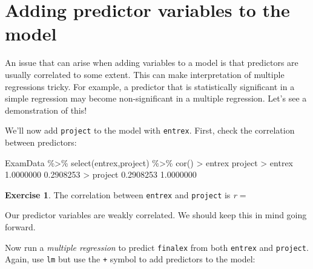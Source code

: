 \documentclass[
]{book}
\newenvironment{Shaded}{\begin{snugshade}}{\end{snugshade}}
\newcommand{\FloatTok}[1]{\textcolor[rgb]{0.00,0.00,0.81}{#1}}
\newcommand{\FunctionTok}[1]{\textcolor[rgb]{0.00,0.00,0.00}{#1}}
\newcommand{\NormalTok}[1]{#1}
\newcommand{\SpecialCharTok}[1]{\textcolor[rgb]{0.00,0.00,0.00}{#1}}
\theoremstyle{definition}
\theoremstyle{definition}
\theoremstyle{definition}
\newtheorem{exercise}{Exercise}[chapter]
\theoremstyle{definition}
\theoremstyle{remark}
\begin{document}
\hypertarget{adding-predictor-variables-to-the-model}{%
\section{Adding predictor variables to the model}\label{adding-predictor-variables-to-the-model}}

An issue that can arise when adding variables to a model is that predictors are usually correlated to some extent. This can make interpretation of multiple regressions tricky. For example, a predictor that is statistically significant in a simple regression may become non-significant in a multiple regression. Let's see a demonstration of this!

We'll now add \texttt{project} to the model with \texttt{entrex}. First, check the correlation between predictors:

\begin{Shaded}
\begin{Highlighting}[]
\NormalTok{ExamData }\SpecialCharTok{\%\textgreater{}\%} 
  \FunctionTok{select}\NormalTok{(entrex,project) }\SpecialCharTok{\%\textgreater{}\%} 
  \FunctionTok{cor}\NormalTok{()}
\SpecialCharTok{\textgreater{}}\NormalTok{            entrex   project}
\SpecialCharTok{\textgreater{}}\NormalTok{ entrex  }\FloatTok{1.0000000} \FloatTok{0.2908253}
\SpecialCharTok{\textgreater{}}\NormalTok{ project }\FloatTok{0.2908253} \FloatTok{1.0000000}
\end{Highlighting}
\end{Shaded}

\begin{exercise}
The correlation between \texttt{entrex} and \texttt{project} is \emph{r} =

Our predictor variables are weakly correlated. We should keep this in mind going forward.
\end{exercise}

Now run a \emph{multiple regression} to predict \texttt{finalex} from both \texttt{entrex} and \texttt{project}. Again, use \texttt{lm} but use the \texttt{+} symbol to add predictors to the model:
\end{document}
